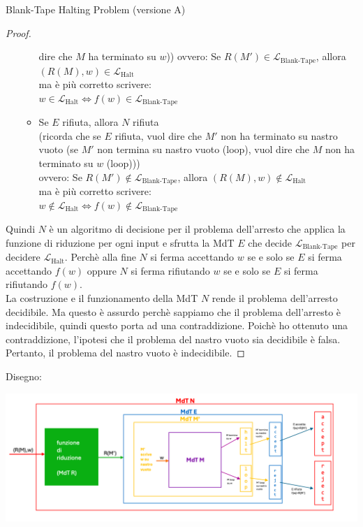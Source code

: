 \documentclass{article}  %
\theoremstyle{definition}
\begin{document}
\begin{theorem}{Blank-Tape Halting Problem (versione A)}
\begin{proof}
\begin{enumerate}
\begin{itemize}
        dire che $M$ ha terminato su $w$))
        ovvero: Se $R(M') \in \mathcal{L}_{\text{Blank-Tape}}$, allora $(R(M),w) \in \mathcal{L}_{\text{Halt}}$ \\
        ma è più corretto scrivere: \\
        $w \in \mathcal{L}_{\text{Halt}} \iff  f(w) \in \mathcal{L}_{\text{Blank-Tape}}$
        \item Se $E$ rifiuta, allora $N$ rifiuta \\
        (ricorda che se $E$ rifiuta, vuol dire che $M'$ non ha terminato su nastro vuoto (se $M'$ non termina su nastro vuoto (loop), vuol
        dire che $M$ non ha terminato su $w$ (loop))) \\ 
        ovvero: Se $R(M') \notin \mathcal{L}_{\text{Blank-Tape}}$, allora $(R(M),w) \notin \mathcal{L}_{\text{Halt}}$ \\
        ma è più corretto scrivere: \\
        $w \notin \mathcal{L}_{\text{Halt}} \iff f(w) \notin \mathcal{L}_{\text{Blank-Tape}}$
      \end{itemize} 
    \end{enumerate}
  Quindi $N$ è un algoritmo di decisione per il problema dell'arresto che applica la funzione di riduzione per ogni input e sfrutta
  la MdT $E$ che decide $\mathcal{L}_{\text{Blank-Tape}}$ per decidere $\mathcal{L}_{\text{Halt}}$. Perchè alla fine $N$ si ferma
  accettando $w$ se e solo se $E$ si ferma accettando $f(w)$ oppure $N$ si ferma
  rifiutando $w$ se e solo se $E$ si ferma rifiutando $f(w)$. \\
  La costruzione e il funzionamento della MdT $N$ rende il problema dell'arresto decidibile. Ma questo è assurdo perchè sappiamo
  che il problema dell'arresto è indecidibile, quindi questo porta ad una contraddizione. Poichè ho ottenuto una contraddizione, l'ipotesi 
  che il problema del nastro vuoto sia decidibile è falsa. Pertanto, il problema del nastro vuoto è indecidibile. 
  \end{proof}
  Disegno: \\
    \begin{center}
    \includegraphics[width=0.9\linewidth]{BTHP.png}
  \end{center}
\end{theorem}
\end{document}

